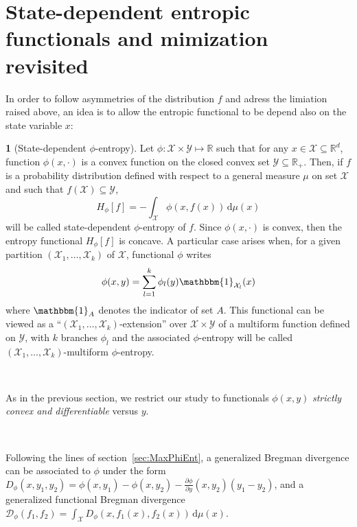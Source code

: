 \documentclass[english,sort&compress]{elsarticle}
\theoremstyle{definition}
\newtheorem{defn}{\protect\definitionname}
\theoremstyle{plain}
\theoremstyle{plain}
\providecommand{\definitionname}{Definition}
\def\dmu{\mathrm{d}\mu}
\def\fD{\mathcal{D}}
\def\Rset{\mathbb{R}}
\def\X{\mathcal{X}}
\def\Y{\mathcal{Y}}
\def\un{\mathbbm{1}}
\begin{document}

\section{State-dependent entropic functionals and mimization revisited}
\label{sec:MultiformEnt}

In order to follow asymmetries of  the distribution $f$ and adress the limiation
raised above, an idea  is to allow the entropic functional to  be depend also on
the state variable $x$:
%
\begin{defn}[State-dependent $\phi$-entropy]\label{def:asym_phi-entropy}
  Let $\phi: \X \times  \Y \mapsto \Rset$ such that for any  $x \in \X \subseteq
  \Rset^d$, function $\phi(x,\cdot)$  is a convex function on  the closed convex
  set  $\Y \subseteq  \Rset_+$.   Then,  if $f$  is  a probability  distribution
  defined with  respect to  a general measure  $\mu$ on  set $\X$ and  such that
  $f(\X) \subseteq \Y$,
  \begin{equation}\label{eq:asym_phi-entropy}
    H_\phi[f] = - \int_\X \phi(x,f(x)) \, \dmu(x)
  \end{equation}
  will be  called state-dependent $\phi$-entropy of  $f$.  Since $\phi(x,\cdot)$
  is convex, then the entropy functional $H_\phi[f]$ is concave.
  A particular case arises when, for  a given partition $(\X_1 , \ldots , \X_k)$
  of $\X$, functional $\phi$ writes
  \begin{equation}\label{eq:multiform_phi-entropy}
    \phi(x,y) = \sum_{l=1}^k \phi_l(y) \un_{\X_l}(x)
  \end{equation}
  where $\un_A$ denotes the indicator of set $A$.  This functional can be viewed
  as a ``$(\X_1 , \ldots , \X_k)$-extension'' over $\X \times \Y$ of a multiform
  function  defined on  $\Y$,  with  $k$ branches  $\phi_l$  and the  associated
  $\phi$-entropy   will   be  called   $(\X_1   ,   \ldots  ,   \X_k)$-multiform
  $\phi$-entropy.
\end{defn}

\

As in  the previous  section, we restrict  our study to  functionals $\phi(x,y)$
{\em strictly convex and differentiable} versus $y$.

\

Following  the  lines  of  section~\ref{sec:MaxPhiEnt},  a  generalized  Bregman
divergence  can be  associated to  $\phi$  under the  form $D_\phi(x,y_1,y_2)  =
\phi(x,y_1) - \phi(x,y_2) - \frac{\partial \phi}{\partial y}(x,y_2) \left( y_1 -
  y_2 \right)$,  and a generalized functional  Bregman divergence $\displaystyle
\fD_\phi(f_1,f_2) = \int_\X D_\phi(x,f_1(x),f_2(x)) \, \dmu(x)$.
\end{document}
